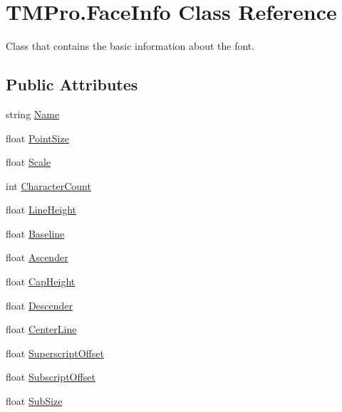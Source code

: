 \hypertarget{class_t_m_pro_1_1_face_info}{}\section{T\+M\+Pro.\+Face\+Info Class Reference}
\label{class_t_m_pro_1_1_face_info}


Class that contains the basic information about the font.  


\subsection*{Public Attributes}
\begin{DoxyCompactItemize}
\item 
string \mbox{\hyperlink{class_t_m_pro_1_1_face_info_a8fbfcc89c49e0f9f6b159c8fc8d1ea84}{Name}}
\item 
float \mbox{\hyperlink{class_t_m_pro_1_1_face_info_a2d120ea15c3c522b77c04901ea69ace7}{Point\+Size}}
\item 
float \mbox{\hyperlink{class_t_m_pro_1_1_face_info_aaa6254a12561da3d2005ce8c0445bc9a}{Scale}}
\item 
int \mbox{\hyperlink{class_t_m_pro_1_1_face_info_a625e4c7118d22fc0e9e8e930c978bd47}{Character\+Count}}
\item 
float \mbox{\hyperlink{class_t_m_pro_1_1_face_info_ac098a68d0e412e509971830c67095870}{Line\+Height}}
\item 
float \mbox{\hyperlink{class_t_m_pro_1_1_face_info_a25c912c275bb151abbf3a4fb0838e847}{Baseline}}
\item 
float \mbox{\hyperlink{class_t_m_pro_1_1_face_info_a24c7184e75041c3aff9b4bb8bd12e17b}{Ascender}}
\item 
float \mbox{\hyperlink{class_t_m_pro_1_1_face_info_af804c415cb294feb2263fbcbfb25b6e8}{Cap\+Height}}
\item 
float \mbox{\hyperlink{class_t_m_pro_1_1_face_info_a96a9406c35a8c64e732fc5e427a58326}{Descender}}
\item 
float \mbox{\hyperlink{class_t_m_pro_1_1_face_info_a88a11296f260a733bd93fe6337c6bc74}{Center\+Line}}
\item 
float \mbox{\hyperlink{class_t_m_pro_1_1_face_info_a938e5a3d334a261aba7eb0c4d571493c}{Superscript\+Offset}}
\item 
float \mbox{\hyperlink{class_t_m_pro_1_1_face_info_a87cf1904453b1f0b56e07809f2ccf248}{Subscript\+Offset}}
\item 
float \mbox{\hyperlink{class_t_m_pro_1_1_face_info_ad6ea70a93cce8776697ec907c5b8ede2}{Sub\+Size}}

\end{DoxyCompactItemize}
